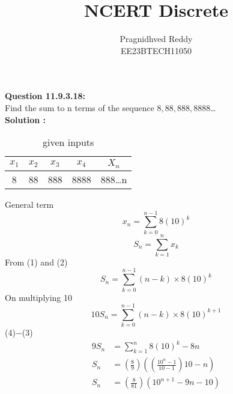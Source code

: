 \documentclass[journal,12pt,twocolumn]{IEEEtran}
\title{NCERT Discrete}
\author{Pragnidhved Reddy\\EE23BTECH11050}
\date{}
\begin{document}
\maketitle
\newpage
\bigskip
\textbf{Question 11.9.3.18:}\\
 Find the sum to n terms of the sequence $8,88,888,8888$\ldots\\
 \textbf{Solution :}\\
 \begin{table}[H]
 \centering
 \begin{tabular}{|c|c|c|c|c|}\hline
 $x_1$ & $x_2$ & $x_3$ & $x_4$ & $X_n$\\ \hline
 8 & 88 & 888 & 8888 & 888\ldots n\\ \hline
 \end{tabular}
  \caption{given inputs}
 \end{table}
 General term
 \begin{equation}
  x_n=\sum^{n-1}_{k=0}8(10)^k
  \end{equation}
  \begin{equation}
 S_n=\sum^{n}_{k=1}x_k
 \end{equation} 
 From (1) and (2) 
\begin{equation}
 S_n=\sum^{n-1}_{k=0}(n-k)\times 8(10)^k
 \end{equation} 
 On multiplying 10
 \begin{equation}
 10S_n=\sum^{n-1}_{k=0}(n-k)\times 8(10)^{k+1}
 \end{equation}
 (4)$-$(3)
 \begin{align}
 9S_n&=\sum^{n}_{k=1}8(10)^k-8n\\[10pt]
 S_n&=\left(\frac{8}{9}\right)\left(\left(\frac{10^n-1}{10-1}\right)10-n\right)\\[10pt]
 S_n&=\left(\frac{8}{81}\right)(10^{n+1}-9n-10)
 \end{align}
 
\end{document}
